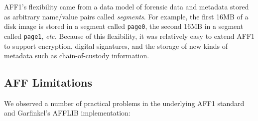 \documentclass[10pt, conference]{IEEEtran}
\begin{document}
AFF1's flexibility came from a data model of forensic data and metadata
stored as arbitrary name/value pairs called \emph{segments}. For
example, the first 16MB of a disk image is stored in a segment called
\texttt{page0}, the second 16MB in a segment called \texttt{page1},
\emph{etc.} Because of this flexibility, it was relatively easy 
to extend AFF1 to support encryption, digital signatures, and the
storage of new kinds of metadata such as chain-of-custody
information\cite{garfinkel:affcrypto}.

\subsection{AFF Limitations}
We observed a number of practical problems in the underlying AFF1
standard and Garfinkel's AFFLIB implementation:
\end{document}
